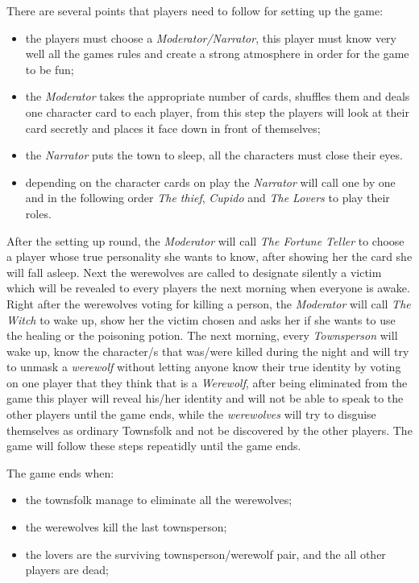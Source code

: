 \documentclass{article}
\begin{document}
There are several points that players need to follow for setting up the game:
\begin{itemize}
	\item the players must choose a \textit{Moderator/Narrator}, this player must know very well all the games rules and create a strong atmosphere in order for the game to be fun;
	\item the \textit{Moderator} takes the appropriate number of cards, shuffles them and deals one character card to each player, from this step the players will look at their card secretly and places it face down in front of themselves;
	\item the \textit{Narrator} puts the town to sleep, all the characters must close their eyes.
	\item depending on the character cards on play the \textit{Narrator} will call one by one and in the following order \textit{The thief}, \textit{Cupido} and \textit{The Lovers} to play their roles.
\end{itemize}
After the setting up round, the \textit{Moderator} will call \textit{The Fortune Teller} to choose a player whose true personality she wants to know, after showing her the card she will fall asleep. Next the werewolves are called to designate silently a victim which will be revealed to every players the next morning when everyone is awake.
Right after the werewolves voting for killing a person, the \textit{Moderator} will call \textit{The Witch} to wake up, show her the victim chosen and asks her if she wants to use the healing or the poisoning potion. 
The next morning, every \textit{Townsperson} will wake up, know the character/s that was/were killed during the night and will try to unmask a \textit{werewolf} without letting anyone know their true identity by voting on one player that they think that is a \textit{Werewolf}, after being eliminated from the game this player will reveal his/her identity and will not be able to speak to the other players until the game ends, while the \textit{werewolves} will try to disguise themselves as ordinary Townsfolk and not be discovered by the other players.
The game will follow these steps repeatidly until the game ends.

The game ends when:
\begin{itemize}
	\item the townsfolk manage to eliminate all the werewolves;
	\item the werewolves kill the last townsperson;
	\item the lovers are the surviving townsperson/werewolf pair, and the all other players are dead; 
\end{itemize}
\end{document}

